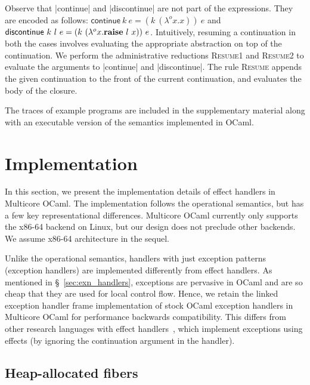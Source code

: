 \documentclass[sigplan,10pt,review,anonymous]{acmart}\settopmatter{printfolios=true,printccs=false,printacmref=false}
\newcommand{\olam}[2]{\lambda^o #1. #2}
\newcommand{\kw}[1]{\text{\bf #1}}
\newcommand{\throw}[2]{\kw{raise} ~#1 ~#2}
\begin{document}
Observe that |continue| and |discontinue| are not part of the expressions. They
are encoded as follows: $\textsf{continue} ~k ~e = (k ~(\olam{x}{x})) ~e$ and
$\textsf{discontinue} ~k ~l ~e = (k ~(\olam{x}{\throw{l}{x}})) ~e$.
Intuitively, resuming a continuation in both the cases involves evaluating the
appropriate abstraction on top of the continuation. We perform the
administrative reductions \textsc{Resume1} and \textsc{Resume2} to evaluate the
arguments to |continue| and |discontinue|. The rule \textsc{Resume} appends the
given continuation to the front of the current continuation, and evaluates the
body of the closure.

The traces of example programs are included in the supplementary material along
with an executable version of the semantics implemented in OCaml.

\section{Implementation}
\label{sec:impl}

In this section, we present the implementation details of effect handlers in
Multicore OCaml. The implementation follows the operational semantics, but has
a few key representational differences. Multicore OCaml currently only supports
the x86-64 backend on Linux, but our design does not preclude other backends.
We assume x86-64 architecture in the sequel.

Unlike the operational semantics, handlers with just exception patterns
(exception handlers) are implemented differently from effect handlers. As
mentioned in \S~\ref{sec:exn_handlers}, exceptions are pervasive in OCaml and
are so cheap that they are used for local control flow. Hence, we retain the
linked exception handler frame implementation of stock OCaml exception handlers
in Multicore OCaml for performance backwards compatibility. This differs from
other research languages with effect handlers~\cite{Hillerstrom20,Frank,Eff},
which implement exceptions using effects (by ignoring the continuation argument
in the handler).

\vspace{-2mm}
\subsection{Heap-allocated fibers}
\end{document}
